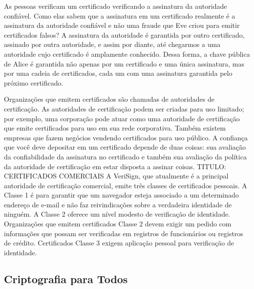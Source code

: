 \documentclass{book}
\begin{document}
As pessoas verificam um certificado verificando a assinatura da autoridade confiável. Como elas sabem que a assinatura em um certificado realmente é a assinatura da autoridade confiável e não uma fraude que Eve criou para emitir certificados falsos? A assinatura da autoridade é garantida por outro certificado, assinado por outra autoridade, e assim por diante, até chegarmos a uma autoridade cujo certificado é amplamente conhecido. Dessa forma, a chave pública de Alice é garantida não apenas por um certificado e uma única assinatura, mas por uma cadeia de certificados, cada um com uma assinatura garantida pelo próximo certificado.

Organizações que emitem certificados são chamadas de autoridades de certificação. As autoridades de certificação podem ser criadas para uso limitado; por exemplo, uma corporação pode atuar como uma autoridade de certificação que emite certificados para uso em sua rede corporativa. Também existem empresas que fazem negócios vendendo certificados para uso público. A confiança que você deve depositar em um certificado depende de duas coisas: sua avaliação da confiabilidade da assinatura no certificado e também sua avaliação da política da autoridade de certificação em estar disposta a assinar coisas.
TITULO: CERTIFICADOS COMERCIAIS
A VeriSign, que atualmente é a principal autoridade de certificação comercial, emite três classes de certificados pessoais. A Classe 1 é para garantir que um navegador esteja associado a um determinado endereço de e-mail e não faz reivindicações sobre a verdadeira identidade de ninguém. A Classe 2 oferece um nível modesto de verificação de identidade. Organizações que emitem certificados Classe 2 devem exigir um pedido com informações que possam ser verificadas em registros de funcionários ou registros de crédito. Certificados Classe 3 exigem aplicação pessoal para verificação de identidade.


\subsection{Criptografia para Todos}
\label{}
\end{document}
